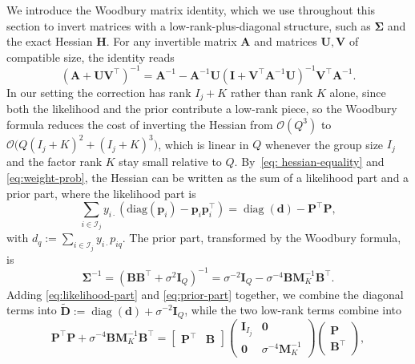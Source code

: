 We introduce the Woodbury matrix identity, which we use throughout this section to invert matrices with a low-rank-plus-diagonal structure, such as $\bm{\Sigma}$ and the exact Hessian $\mathbf{H}$. For any invertible matrix $\mathbf{A}$ and matrices $\mathbf{U}, \mathbf{V}$ of compatible size, the identity reads
\begin{equation}
    \left(\mathbf{A} + \mathbf{U}\mathbf{V}^{\top}\right)^{-1} = \mathbf{A}^{-1} - \mathbf{A}^{-1}\mathbf{U}\left(\mathbf{I} + \mathbf{V}^{\top}\mathbf{A}^{-1}\mathbf{U}\right)^{-1}\mathbf{V}^{\top}\mathbf{A}^{-1}.
    \label{eq:standard-woodbury}
\end{equation}
In our setting the correction has rank $I_j+K$ rather than rank $K$ alone, since both the likelihood and the prior contribute a low-rank piece, so the Woodbury formula reduces the cost of inverting the Hessian from $\mathcal{O}(Q^3)$ to $\mathcal{O}\big(Q(I_j+K)^2+(I_j+K)^3\big)$, which is linear in $Q$ whenever the group size $I_j$ and the factor rank $K$ stay small relative to $Q$. By~\eqref{eq: hessian-equality} and \eqref{eq:weight-prob}, the Hessian can be written as the sum of a likelihood part and a prior part, where the likelihood part is
\begin{equation}
    \sum_{i\in\mathcal{I}_{j}}y_{i\cdot}\left(\text{diag}(\bm{p}_{i})-\bm{p}_{i}\bm{p}_{i}^{\top}\right)=\operatorname{diag}\left(\mathbf{d}\right)-\mathbf{P}^{\top}\mathbf{P},
    \label{eq:likelihood-part}
\end{equation}
with $d_q:=\sum_{i\in\mathcal{I}_j}y_{i\cdot}p_{iq}$. The prior part, transformed by the Woodbury formula, is
\begin{equation}
    \bm{\Sigma}^{-1} = \left(\mathbf{B}\mathbf{B}^{\top} + \sigma^2 \mathbf{I}_Q\right)^{-1} = \sigma^{-2}\mathbf{I}_Q - \sigma^{-4}\mathbf{B}\mathbf{M}_K^{-1}\mathbf{B}^{\top}.
    \label{eq:prior-part}
\end{equation}
Adding \eqref{eq:likelihood-part} and \eqref{eq:prior-part} together, we combine the diagonal terms into $\tilde{\mathbf{D}}:=\operatorname{diag}\left(\mathbf{d}\right)+\sigma^{-2}\mathbf{I}_{Q}$, while the two low-rank terms combine into
\begin{equation}
    \mathbf{P}^{\top}\mathbf{P} + \sigma^{-4}\mathbf{B}\mathbf{M}_K^{-1}\mathbf{B}^{\top}
    = \begin{bmatrix} \mathbf{P}^{\top} & \mathbf{B} \end{bmatrix}
    \begin{pmatrix} \mathbf{I}_{I_{j}} & \bm{0}\\ \bm{0} & \sigma^{-4}\mathbf{M}_K^{-1} \end{pmatrix}
    \begin{pmatrix} \mathbf{P} \\ \mathbf{B}^{\top} \end{pmatrix},
    \label{eq:combined}
\end{equation}
